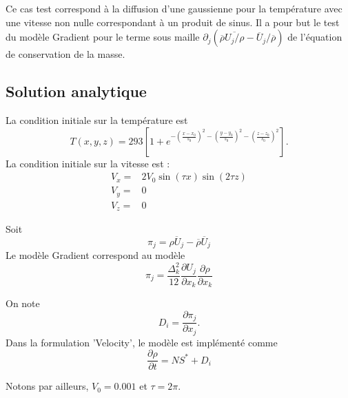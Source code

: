 Ce cas test correspond \`a la diffusion d'une gaussienne pour la temp\'erature avec une vitesse non nulle correspondant \`a un produit de sinus. Il a pour but le test du mod\`ele Gradient pour le terme sous maille $\partial_j\left(\overline{\rho} \overline{U_j/\rho} - \overline{U}_j/\overline{\rho}\right)$ de l'\'equation de conservation de la masse.

\subsection{Solution analytique}

La condition initiale sur la temp\'erature est
\begin{equation}
T\left(x,y,z\right) = 293 \left[1 + e^{-\left(\frac{x-x_0}{s_0}\right)^2-\left(\frac{y-y_0}{s_0}\right)^2-\left(\frac{z-z_0}{s_0}\right)^2}\right].
\end{equation}
La condition initiale sur la vitesse est :
\begin{align*}
V_x ={}& 2 V_0 \sin(\tau x) \sin(2 \tau z) \\
V_y ={}& 0 \\
V_z ={}& 0
\end{align*}

Soit
\begin{equation}
\pi_{j} = \overline{\rho U_j} - \overline{\rho}\overline{U}_j
\end{equation}
Le mod\`ele Gradient correspond au mod\`ele
\begin{equation}
\pi_{j} = \frac{\Delta_k^2}{12} \frac{\partial U_j}{\partial x_k} \frac{\partial \rho}{\partial x_k}
\end{equation}

On note
\begin{equation}
D_i = \frac{\partial \pi_{j}}{\partial x_j}.
\end{equation}
Dans la formulation 'Velocity', le mod\`ele est impl\'ement\'e comme
\begin{equation}
\frac{\partial \rho}{\partial t} = NS^* + D_i
\end{equation}

Notons par ailleurs, $V_0 = 0.001$ et $\tau=2\pi$.

